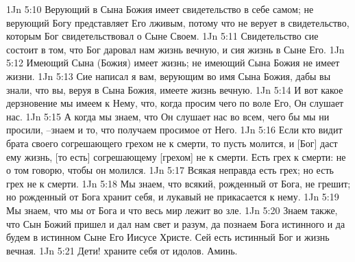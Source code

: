 1Jn 5:10  Верующий в Сына Божия имеет свидетельство в себе самом; не верующий Богу представляет Его лживым, потому что не верует в свидетельство, которым Бог свидетельствовал о Сыне Своем.
1Jn 5:11  Свидетельство сие состоит в том, что Бог даровал нам жизнь вечную, и сия жизнь в Сыне Его.
1Jn 5:12  Имеющий Сына (Божия) имеет жизнь; не имеющий Сына Божия не имеет жизни.
1Jn 5:13  Сие написал я вам, верующим во имя Сына Божия, дабы вы знали, что вы, веруя в Сына Божия, имеете жизнь вечную.
1Jn 5:14  И вот какое дерзновение мы имеем к Нему, что, когда просим чего по воле Его, Он слушает нас.
1Jn 5:15  А когда мы знаем, что Он слушает нас во всем, чего бы мы ни просили, --знаем и то, что получаем просимое от Него.
1Jn 5:16  Если кто видит брата своего согрешающего грехом не к смерти, то пусть молится, и [Бог] даст ему жизнь, [то есть] согрешающему [грехом] не к смерти. Есть грех к смерти: не о том говорю, чтобы он молился.
1Jn 5:17  Всякая неправда есть грех; но есть грех не к смерти.
1Jn 5:18  Мы знаем, что всякий, рожденный от Бога, не грешит; но рожденный от Бога хранит себя, и лукавый не прикасается к нему.
1Jn 5:19  Мы знаем, что мы от Бога и что весь мир лежит во зле.
1Jn 5:20  Знаем также, что Сын Божий пришел и дал нам свет и разум, да познаем Бога истинного и да будем в истинном Сыне Его Иисусе Христе. Сей есть истинный Бог и жизнь вечная.
1Jn 5:21  Дети! храните себя от идолов. Аминь.



